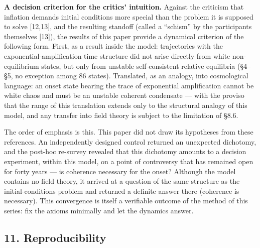 \documentclass[
  a4paper,
]{article}
\begin{document}
\textbf{A decision criterion for the critics' intuition.} Against the
criticism that inflation demands initial conditions more special than
the problem it is supposed to solve {[}12,13{]}, and the resulting
standoff (called a ``schism'' by the participants themselves {[}13{]}),
the results of this paper provide a dynamical criterion of the following
form. First, as a result inside the model: trajectories with the
exponential-amplification time structure did not arise directly from
white non-equilibrium states, but only from unstable self-consistent
relative equilibria (§4--§5, no exception among 86 states). Translated,
as an analogy, into cosmological language: an onset state bearing the
trace of exponential amplification cannot be white chaos and must be an
unstable coherent condensate --- with the proviso that the range of this
translation extends only to the structural analogy of this model, and
any transfer into field theory is subject to the limitation of §8.6.

The order of emphasis is this. This paper did not draw its hypotheses
from these references. An independently designed control returned an
unexpected dichotomy, and the post-hoc re-survey revealed that this
dichotomy amounts to a decision experiment, within this model, on a
point of controversy that has remained open for forty years --- is
coherence necessary for the onset? Although the model contains no field
theory, it arrived at a question of the same structure as the
initial-conditions problem and returned a definite answer there
(coherence is necessary). This convergence is itself a verifiable
outcome of the method of this series: fix the axioms minimally and let
the dynamics answer.

\subsection{11. Reproducibility}\label{reproducibility}
\end{document}

